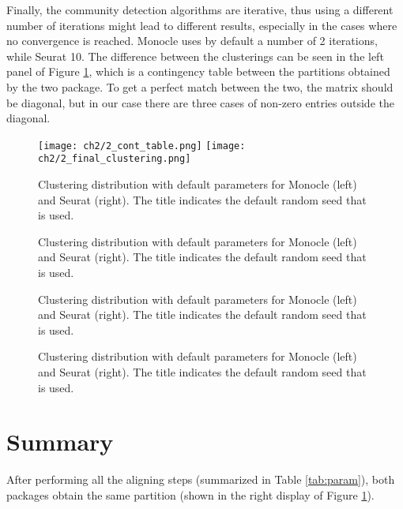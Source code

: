 Finally, the community detection algorithms are iterative, thus using a different number of iterations might lead to different results, especially in the cases where no convergence is reached. Monocle uses by default a number of 2 iterations, while Seurat 10. The difference between the clusterings can be seen in the left panel of Figure \ref{fig:s4-m3-cont}, which is a contingency table between the partitions obtained by the two package. To get a perfect match between the two, the matrix should be diagonal, but in our case there are three cases of non-zero entries outside the diagonal.
\begin{figure}[H]
    \centering
    \texttt{[image: ch2/2\_cont\_table.png]}
    \texttt{[image: ch2/2\_final\_clustering.png]}
    \caption{\label{fig:s4-m3-cont}Clustering distribution with default parameters for Monocle (left) and Seurat (right). The title indicates the default random seed that is used.}
\end{figure}

\begin{landscape}
\begin{figure}[H]
    \centering
    \caption{\label{fig:s4-m3-graph-alg}Clustering distribution with default parameters for Monocle (left) and Seurat (right). The title indicates the default random seed that is used.}
\end{figure}

\begin{figure}[H]
    \centering
    \caption{\label{fig:s4-m3-quality}Clustering distribution with default parameters for Monocle (left) and Seurat (right). The title indicates the default random seed that is used.}
\end{figure}

\begin{figure}[H]
    \centering
    \caption{\label{fig:s4-m3-res}Clustering distribution with default parameters for Monocle (left) and Seurat (right). The title indicates the default random seed that is used.}
\end{figure}
\end{landscape}




\section{Summary}
After performing all the aligning steps (summarized in Table \ref{tab:param}), both packages obtain the same partition (shown in the right display of Figure \ref{fig:s4-m3-cont}).

